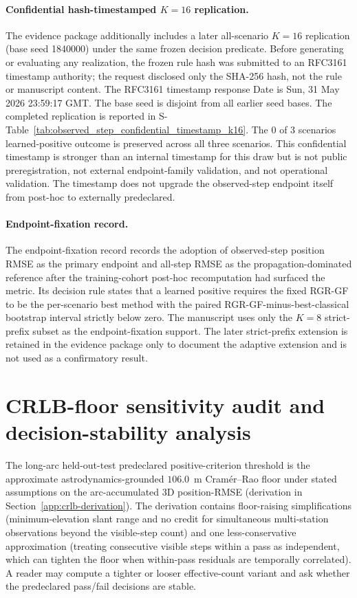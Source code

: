 \documentclass{article}
\begin{document}
\paragraph{Confidential hash-timestamped $K=16$ replication.}
The evidence package additionally includes a later all-scenario $K=16$ replication (base seed 1840000) under the same frozen decision predicate. Before generating or evaluating any realization, the frozen rule hash was submitted to an RFC3161 timestamp authority; the request disclosed only the SHA-256 hash, not the rule or manuscript content. The RFC3161 timestamp response Date is Sun, 31 May 2026 23:59:17 GMT. The base seed is disjoint from all earlier seed bases. The completed replication is reported in S-Table~\ref{tab:observed_step_confidential_timestamp_k16}. The 0 of 3 scenarios learned-positive outcome is preserved across all three scenarios. This confidential timestamp is stronger than an internal timestamp for this draw but is not public preregistration, not external endpoint-family validation, and not operational validation. The timestamp does not upgrade the observed-step endpoint itself from post-hoc to externally predeclared.

\paragraph{Endpoint-fixation record.}
The endpoint-fixation record records the adoption of observed-step position RMSE as the primary endpoint and all-step RMSE as the propagation-dominated reference after the training-cohort post-hoc recomputation had surfaced the metric. Its decision rule states that a learned positive requires the fixed RGR-GF to be the per-scenario best method with the paired RGR-GF-minus-best-classical bootstrap interval strictly below zero. The manuscript uses only the $K=8$ strict-prefix subset as the endpoint-fixation support. The later strict-prefix extension is retained in the evidence package only to document the adaptive extension and is not used as a confirmatory result.

\section{CRLB-floor sensitivity audit and decision-stability analysis}
\label{app:floor-sensitivity-and-stability}

The long-arc held-out-test predeclared positive-criterion threshold is the approximate astrodynamics-grounded $106.0$~m Cram\'er--Rao floor under stated assumptions on the arc-accumulated 3D position-RMSE (derivation in Section~\ref{app:crlb-derivation}). The derivation contains floor-raising simplifications (minimum-elevation slant range and no credit for simultaneous multi-station observations beyond the visible-step count) and one less-conservative approximation (treating consecutive visible steps within a pass as independent, which can tighten the floor when within-pass residuals are temporally correlated). A reader may compute a tighter or looser effective-count variant and ask whether the predeclared pass/fail decisions are stable.
\end{document}
